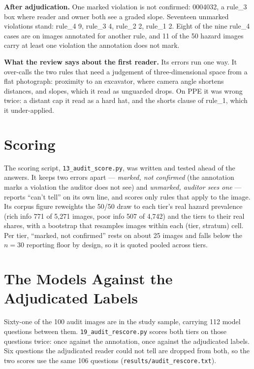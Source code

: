 \textbf{After adjudication.} One marked violation is not confirmed: 0004032, a rule\_3 box where reader and
owner both see a graded slope. Seventeen unmarked violations stand: rule\_4 9, rule\_3 4, rule\_2 2, rule\_1 2.
Eight of the nine rule\_4 cases are on images annotated for another rule, and 11 of the 50 hazard images carry
at least one violation the annotation does not mark.

\textbf{What the review says about the first reader.} Its errors run one way. It over-calls the two rules that
need a judgement of three-dimensional space from a flat photograph: proximity to an excavator, where camera
angle shortens distances, and slopes, which it read as unguarded drops. On PPE it was wrong twice: a
distant cap it read as a hard hat, and the shorts clause of rule\_1, which it under-applied.

\section{Scoring}

The scoring script, \texttt{13\_audit\_score.py}, was written and tested ahead of the answers. It keeps two errors apart ---
\emph{marked, not confirmed} (the annotation marks a violation the auditor does not see) and \emph{unmarked,
auditor sees one} --- reports ``can't tell'' on its own line, and scores only rules that apply to the
image. Its corpus figure reweights the 50/50 draw to each tier's real hazard prevalence (rich info 771 of
5,271 images, poor info 507 of 4,742) and the tiers to their real shares, with a bootstrap that resamples
images within each (tier, stratum) cell. Per tier, ``marked, not confirmed'' rests on about 25 images and
falls below the $n=30$ reporting floor by design, so it is quoted pooled across tiers.

\section{The Models Against the Adjudicated Labels}

Sixty-one of the 100 audit images are in the study sample, carrying 112 model questions between them.
\texttt{19\_audit\_rescore.py} scores both tiers on those questions twice: once against the annotation, once
against the adjudicated labels. Six questions the adjudicated reader could not tell are dropped from both,
so the two scores use the same 106 questions (\texttt{results/audit\_rescore.txt}).

